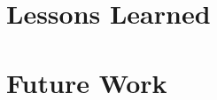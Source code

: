 \documentclass[bsc,frontabs,singlespacing,parskip,deptreport,normalheadings]{infthesis}
\begin{document}
\section{Lessons Learned}

\section{Future Work}




%
%
%
\end{document}
